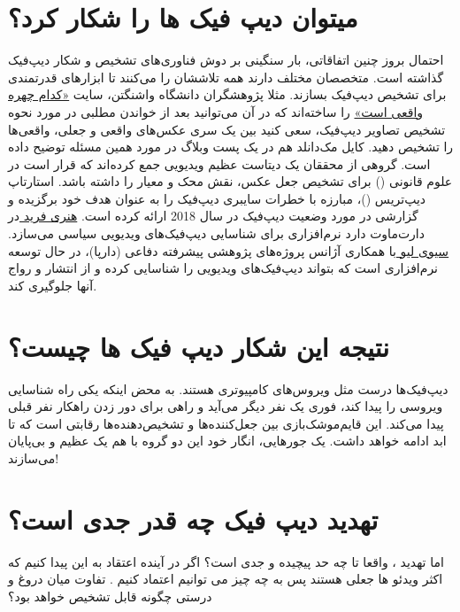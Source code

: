 \documentclass[12pt,a4paper]{report}
\begin{document}
\section{میتوان دیپ فیک ها را شکار کرد؟} 	
 	احتمال بروز چنین اتفاقاتی، بار سنگینی بر دوش فناوری‌های تشخیص و شکار دیپ‌فیک گذاشته است. متخصصان مختلف دارند همه تلاششان را می‌کنند تا ابزارهای قدرتمندی برای تشخیص دیپ‌فیک بسازند. مثلا پژوهشگران دانشگاه واشنگتن، سایت \textcolor{blue}{\href{http://www.whichfaceisreal.com/learn.html}{«کدام چهره واقعی است»} } را ساخته‌اند که در آن می‌توانید بعد از خواندن مطلبی در مورد نحوه تشخیص تصاویر دیپ‌فیک، سعی کنید بین یک سری عکس‌های واقعی و جعلی، واقعی‌ها را تشخیص دهید. کایل مک‌دانلد هم در یک پست وبلاگ در مورد همین مسئله توضیح داده است. گروهی از محققان یک دیتاست عظیم ویدیویی جمع کرده‌اند که قرار است در علوم قانونی () برای تشخیص جعل عکس، نقش محک و معیار را داشته باشد. استارتاپ دیپ‌تریس ()، مبارزه با خطرات سایبری دیپ‌فیک را به عنوان هدف خود برگزیده و گزارشی در مورد وضعیت دیپ‌فیک در سال 2018 ارائه کرده است. \href{https://edition.cnn.com/2019/04/26/tech/ai-deepfake-detection-2020/index.html}{هنری فرید }در دارت‌ماوت دارد نرم‌افزاری برای شناسایی دیپ‌فیک‌های ویدیویی سیاسی می‌سازد. \href{https://www.usatoday.com/story/tech/2019/05/13/deepfakes-why-your-instagram-photos-video-could-be-vulnerable/3344536002/}{سیوی لیو }با همکاری آژانس پروژه‌های پژوهشی پیشرفته دفاعی (دارپا)، در حال توسعه نرم‌افزاری است که بتواند دیپ‌فیک‌های ویدیویی را شناسایی کرده و از انتشار و رواج آنها جلوگیری کند.
\section{نتیجه این شکار دیپ فیک ها  چیست؟} 
 	دیپ‌فیک‌ها درست مثل ویروس‌های کامپیوتری هستند. به محض اینکه یکی راه شناسایی‌ ویروسی را پیدا کند، فوری یک نفر دیگر می‌آید و راهی برای دور زدن راهکار نفر قبلی پیدا می‌کند. این قایم‌موشک‌بازی بین جعل‌کننده‌ها و تشخیص‌دهنده‌ها رقابتی است که تا ابد ادامه خواهد داشت. یک جورهایی، انگار خود این دو گروه با هم یک  عظیم و بی‌پایان می‌سازند!
 	
\section{تهدید دیپ فیک  چه قدر جدی است؟}
اما تهدید ، واقعا تا چه حد پیچیده و جدی است؟ اگر در آینده اعتقاد به این پیدا کنیم که اکثر ویدئو ها جعلی هستند پس به چه چیز می توانیم اعتماد کنیم . تفاوت میان دروغ و درستی چگونه قابل تشخیص خواهد بود؟
\end{document}
